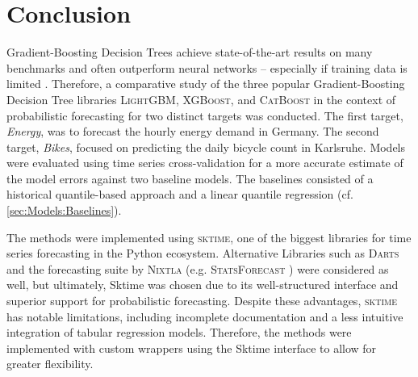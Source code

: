\newpage
\section{Conclusion}
\label{ch:Conclusion}
Gradient-Boosting Decision Trees achieve state-of-the-art results on many benchmarks and often outperform neural networks -- especially if training data is limited \parencites{shwartz-ziv_tabular_2021, grinsztajn_why_2022}. Therefore, a comparative study of the three popular Gradient-Boosting Decision Tree libraries \textsc{LightGBM}, \textsc{XGBoost}, and \textsc{CatBoost} in the context of probabilistic forecasting for two distinct targets was conducted. The first target, \textit{Energy}, was to forecast the hourly energy demand in Germany. The second target, \textit{Bikes}, focused on predicting the daily bicycle count in Karlsruhe. Models were evaluated using time series cross-validation for a more accurate estimate of the model errors against two baseline models. The baselines consisted of a historical quantile-based approach and a linear quantile regression (cf. \cref{sec:Models:Baselines}).

The methods were implemented using \textsc{sktime}, one of the biggest libraries for time series forecasting in the Python ecosystem. Alternative Libraries such as \textsc{Darts} \parencite{herzen_darts_2022} and the forecasting suite by \textsc{Nixtla} (e.g. \textsc{StatsForecast} \parencite{azul_garza_statsforecast_2022}) were considered as well, but ultimately, Sktime was chosen due to its well-structured interface and superior support for probabilistic forecasting. Despite these advantages, \textsc{sktime} has notable limitations, including incomplete documentation and a less intuitive integration of tabular regression models. Therefore, the methods were implemented with custom wrappers using the Sktime interface to allow for greater flexibility.

